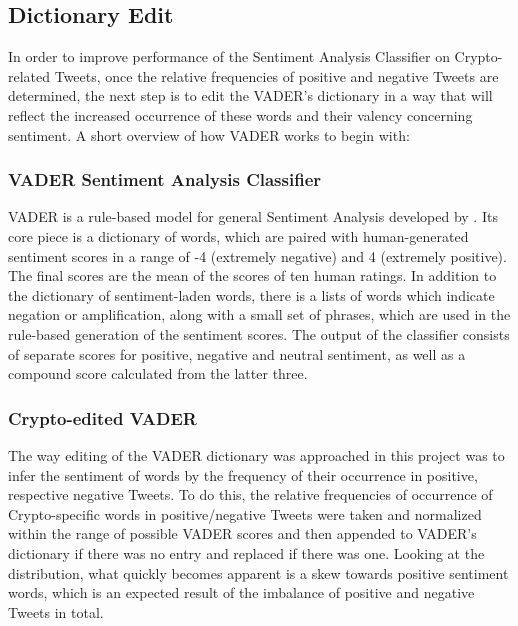 \documentclass[11pt]{article}
\begin{document}
\subsection{Dictionary Edit}
In order to improve performance of the Sentiment Analysis Classifier on Crypto-related Tweets, once the relative frequencies of positive and negative Tweets are determined, the next step is to edit the VADER's dictionary in a way that will reflect the increased occurrence of these words and their valency concerning sentiment. A short overview of how VADER works to begin with:

\subsubsection{VADER Sentiment Analysis Classifier} 
VADER is a rule-based model for general Sentiment Analysis developed by \citet{vader}. Its core piece is a dictionary of words, which are paired with human-generated sentiment scores in a range of -4 (extremely negative) and 4 (extremely positive). The final scores are the mean of the scores of ten human ratings. In addition to the dictionary of sentiment-laden words, there is a lists of words which indicate negation or amplification, along with a small set of phrases, which are used in the rule-based generation of the sentiment scores. The output of the classifier consists of separate scores for positive, negative and neutral sentiment, as well as a compound score calculated from the latter three.

\subsubsection{Crypto-edited VADER}
The way editing of the VADER dictionary was approached in this project was to infer the sentiment of words by the frequency of their occurrence in positive, respective negative Tweets. To do this, the relative frequencies of occurrence of Crypto-specific words in positive/negative Tweets were taken and normalized within the range of possible VADER scores and then appended to VADER's dictionary if there was no entry and replaced if there was one. Looking at the distribution, what quickly becomes apparent is a skew towards positive sentiment words, which is an expected result of the imbalance of positive and negative Tweets in total. \\ 
\end{document}
